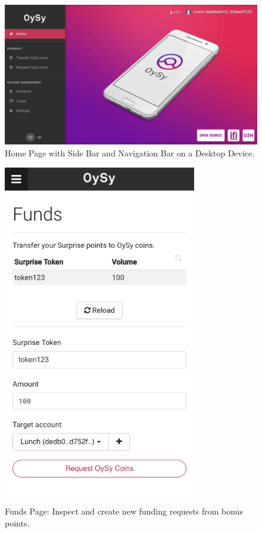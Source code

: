 \begin{figure}
\centering
\includegraphics[width=1\textwidth]{screenshots/Home.png}
\caption{\label{fig:uihome}Home Page with Side Bar and Navigation Bar on a Desktop Device.}
\end{figure}

\begin{figure}
\centering
\includegraphics[width=0.75\textwidth]{screenshots/Funds-1.png}
\caption{\label{fig:uifunds1}Funds Page: Inspect and create new funding requests from bonus points.}
\end{figure}

